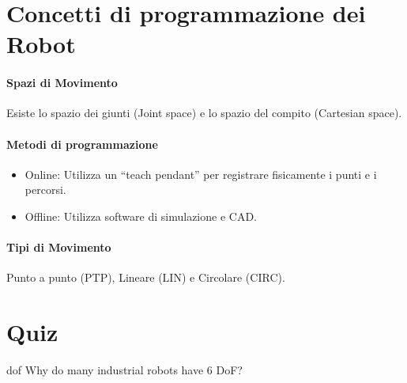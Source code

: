 %
\section{Concetti di programmazione dei Robot}
%
\paragraph{Spazi di Movimento} Esiste lo spazio dei giunti (Joint space) e lo spazio del compito (Cartesian space).
%
\paragraph{Metodi di programmazione}
\begin{itemize}
    \item Online: Utilizza un ``teach pendant'' per registrare fisicamente i punti e i percorsi.
    \item Offline: Utilizza software di simulazione e CAD.
\end{itemize}
%
\paragraph{Tipi di Movimento} Punto a punto (PTP), Lineare (LIN) e Circolare (CIRC).

%
\section{Quiz}
\begin{qst}{}{dof}
    Why do many industrial robots have 6 DoF?
\end{qst}